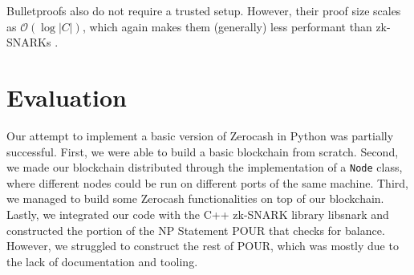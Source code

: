 \documentclass{article}
\begin{document}
Bulletproofs also do not require a trusted setup. However, their proof size scales as $\mathcal{O}(\log{|C|})$, which again makes them (generally) less performant than zk-SNARKs \cite{zk-snarks-blockchains-chapter}.

\section{Evaluation}
Our attempt to implement a basic version of Zerocash in Python was partially successful. First, we were able to build a basic blockchain from scratch. Second, we made our blockchain distributed through the implementation of a \texttt{Node} class, where different nodes could be run on different ports of the same machine. Third, we managed to build some Zerocash functionalities on top of our blockchain. Lastly, we integrated our code with the C++ zk-SNARK library libsnark and constructed the portion of the NP Statement POUR that checks for balance. However, we struggled to construct the rest of POUR, which was mostly due to the lack of documentation and tooling.

\printbibliography
\end{document}

